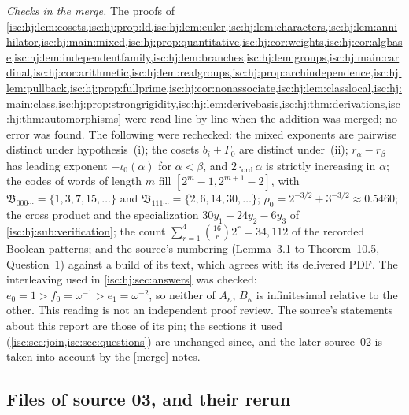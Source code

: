 \documentclass[11pt,letterpaper]{article}
\theoremstyle{definition}
\theoremstyle{remark}
\newcommand{\mtag}{\textup{[merge]}}%
\newcommand{\Ord}{\operatorname{ord}}%
\numberwithin{equation}{section}
\begin{document}
\emph{Checks in the merge.} The proofs of
\cref{isc:hj:lem:cosets,isc:hj:prop:ld,isc:hj:lem:euler,isc:hj:lem:characters,isc:hj:lem:annihilator,isc:hj:main:mixed,isc:hj:prop:quantitative,isc:hj:cor:weights,isc:hj:cor:algbase,isc:hj:lem:independentfamily,isc:hj:lem:branches,isc:hj:lem:groups,isc:hj:main:cardinal,isc:hj:cor:arithmetic,isc:hj:lem:realgroups,isc:hj:prop:archindependence,isc:hj:lem:pullback,isc:hj:prop:fullprime,isc:hj:cor:nonassociate,isc:hj:lem:classlocal,isc:hj:main:class,isc:hj:prop:strongrigidity,isc:hj:lem:derivebasis,isc:hj:thm:derivations,isc:hj:thm:automorphisms}
were read line by line when the addition was merged; no error was found.
The following were rechecked: the mixed exponents are pairwise distinct
under hypothesis~(i); the cosets $b_i+\Gamma_0$ are distinct under~(ii);
$r_\alpha-r_\beta$ has leading exponent $-\iota_0(\alpha)$ for
$\alpha<\beta$, and $2\cdot_{\Ord}\alpha$ is strictly increasing in
$\alpha$; the codes of words of length $m$ fill $[2^m-1,2^{m+1}-2]$, with
$\mathfrak B_{000\cdots}=\{1,3,7,15,\ldots\}$ and
$\mathfrak B_{111\cdots}=\{2,6,14,30,\ldots\}$; $\rho_0=2^{-3/2}+3^{-3/2}\approx
0.5460$; the cross product and the specialization $30y_1-24y_2-6y_3$ of
\cref{isc:hj:sub:verification}; the count
$\sum_{r=1}^4\binom{16}{r}2^r=34{,}112$ of the recorded Boolean patterns;
and the source's numbering (Lemma~3.1 to Theorem~10.5, Question~1) against
a build of its text, which agrees with its delivered PDF. The interleaving
used in \cref{isc:hj:sec:answers} was checked: $e_0=1>f_0=\omega^{-1}>
e_1=\omega^{-2}$, so neither of $A_\kappa$, $B_\kappa$ is infinitesimal
relative to the other. This reading is not an independent proof review.
The source's statements about this report are those of its pin; the
sections it used (\cref{isc:sec:join,isc:sec:questions}) are unchanged since,
and the later source~02 is taken into account by the \mtag{} notes.

\subsection{Files of source 03, and their rerun}\label{isc:hj:app:files}
\end{document}
